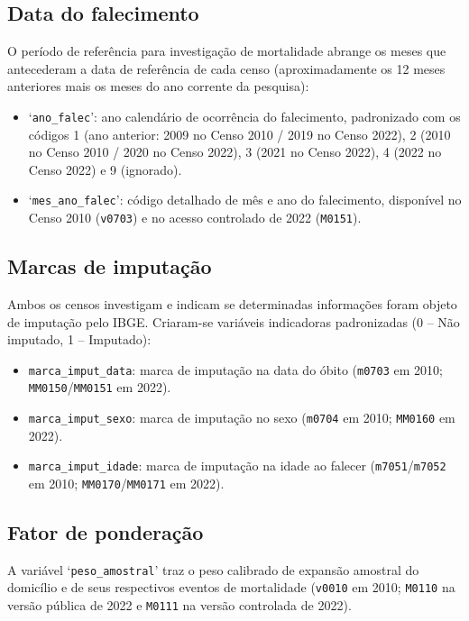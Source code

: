 \documentclass[12pt,a4paper]{article}
\newcommand{\vr}[1]{\texttt{#1}}
\begin{document}
\subsection{Data do falecimento}
O período de referência para investigação de mortalidade abrange os meses que antecederam a data de referência de cada censo (aproximadamente os 12 meses anteriores mais os meses do ano corrente da pesquisa):
\begin{itemize}
  \item ‘\vr{ano\_falec}’: ano calendário de ocorrência do falecimento, padronizado com os códigos 1 (ano anterior: 2009 no Censo 2010 / 2019 no Censo 2022), 2 (2010 no Censo 2010 / 2020 no Censo 2022), 3 (2021 no Censo 2022), 4 (2022 no Censo 2022) e 9 (ignorado).
  \item ‘\vr{mes\_ano\_falec}’: código detalhado de mês e ano do falecimento, disponível no Censo 2010 (\vr{v0703}) e no acesso controlado de 2022 (\vr{M0151}).
\end{itemize}

\subsection{Marcas de imputação}
Ambos os censos investigam e indicam se determinadas informações foram objeto de imputação pelo IBGE. Criaram-se variáveis indicadoras padronizadas (0 -- Não imputado, 1 -- Imputado):
\begin{itemize}
  \item \vr{marca\_imput\_data}: marca de imputação na data do óbito (\vr{m0703} em 2010; \vr{MM0150}/\vr{MM0151} em 2022).
  \item \vr{marca\_imput\_sexo}: marca de imputação no sexo (\vr{m0704} em 2010; \vr{MM0160} em 2022).
  \item \vr{marca\_imput\_idade}: marca de imputação na idade ao falecer (\vr{m7051}/\vr{m7052} em 2010; \vr{MM0170}/\vr{MM0171} em 2022).
\end{itemize}

\subsection{Fator de ponderação}
A variável ‘\vr{peso\_amostral}’ traz o peso calibrado de expansão amostral do domicílio e de seus respectivos eventos de mortalidade (\vr{v0010} em 2010; \vr{M0110} na versão pública de 2022 e \vr{M0111} na versão controlada de 2022).
\end{document}

